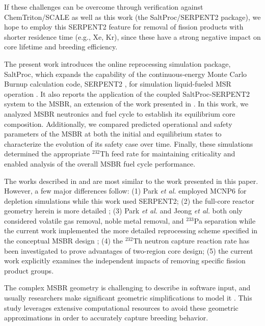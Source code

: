 If these challenges can be overcome through verification against
ChemTriton/SCALE as well as this work (the SaltProc/SERPENT2 package), we hope to 
employ this SERPENT2 feature 
for removal of fission products with shorter residence time (e.g., Xe, Kr), 
since these have a strong negative impact on core lifetime and breeding 
efficiency.

The present work introduces the online reprocessing simulation package, SaltProc, 
which expands the capability of the continuous-energy Monte Carlo Burnup 
calculation code, SERPENT2 \cite{leppanen_serpent_2015}, for simulation 
liquid-fueled \gls{MSR} operation 
\cite{rykhlevskii_arfc/saltproc:_2018}. It also reports the 
application of the coupled SaltProc-SERPENT2 system to the \gls{MSBR}, an 
extension of the work presented in 
\cite{rykhlevskii_full-core_2017, rykhlevskii_online_2017}. In this work, we 
analyzed \gls{MSBR} neutronics and fuel cycle to establish its equilibrium core 
composition. Additionally, we compared predicted operational and safety parameters of the \gls{MSBR} at 
both the initial and equilibrium states to characterize the evolution of its 
safety case over time. Finally, these simulations determined the appropriate $^{232}$Th feed rate  
for maintaining criticality and enabled analysis of the overall \gls{MSBR} fuel 
cycle performance.

The works described in \cite{park_whole_2015} and \cite{jeong_equilibrium_2016} 
are most similar to the work presented in this paper. However, a few major 
differences follow: (1) Park \emph{et al.} employed MCNP6 for depletion 
simulations while this work used SERPENT2; (2) the full-core reactor 
geometry herein is more detailed \cite{rykhlevskii_full-core_2017}; (3) Park \emph{et al.} and Jeong \emph{et al.} 
both only considered volatile gas removal, noble metal removal, and $^{233}$Pa separation while 
the current work implemented the more detailed reprocessing scheme specified in 
the conceptual \gls{MSBR} design \cite{robertson_conceptual_1971}; (4) the $^{232}$Th neutron 
capture reaction rate has been investigated to prove advantages of two-region core 
design; (5) the current work explicitly examines the independent impacts of removing specific fission product groups. 

The complex \gls{MSBR} geometry is challenging to describe in software input, 
and usually researchers make significant geometric simplifications to model it 
\cite{park_whole_2015}. This study leverages extensive computational 
resources to avoid these geometric approximations in order to accurately capture 
breeding behavior. 
